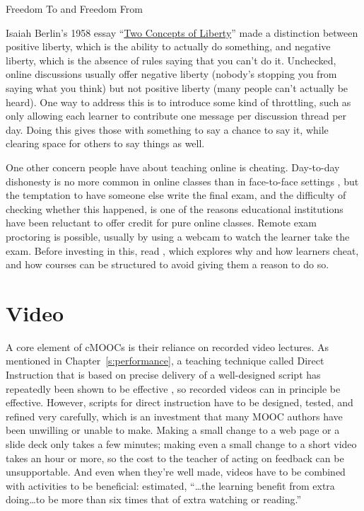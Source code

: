 \begin{aside}{Freedom To and Freedom From}

Isaiah Berlin's 1958 essay ``\href{https://en.wikipedia.org/wiki/Two\_Concepts\_of\_Liberty}{Two Concepts of
Liberty}'' made a distinction between positive
liberty, which is the ability to actually do something, and negative
liberty, which is the absence of rules saying that you can't do
it. Unchecked, online discussions usually offer negative liberty
(nobody's stopping you from saying what you think) but not positive
liberty (many people can't actually be heard). One way to address
this is to introduce some kind of throttling, such as only allowing
each learner to contribute one message per discussion thread per
day. Doing this gives those with something to say a chance to say
it, while clearing space for others to say things as well.

\end{aside}

One other concern people have about teaching online is cheating.
Day-to-day dishonesty is no more common in online classes than in
face-to-face settings \cite{Beck2014}, but the temptation to have
someone else write the final exam, and the difficulty of checking
whether this happened, is one of the reasons educational institutions
have been reluctant to offer credit for pure online classes. Remote exam
proctoring is possible, usually by using a webcam to watch the learner
take the exam. Before investing in this, read \cite{Lang2013}, which
explores why and how learners cheat, and how courses can be structured
to avoid giving them a reason to do so.

\section{Video}\label{s:online-video}

A core element of cMOOCs is their reliance on recorded video lectures.
As mentioned in Chapter~\ref{s:performance}, a teaching technique called
Direct Instruction that is based on precise delivery of a well-designed
script has repeatedly been shown to be effective \cite{Stoc2018}, so
recorded videos can in principle be effective. However, scripts for
direct instruction have to be designed, tested, and refined very
carefully, which is an investment that many MOOC authors have been
unwilling or unable to make. Making a small change to a web page or a
slide deck only takes a few minutes; making even a small change to a
short video takes an hour or more, so the cost to the teacher of acting
on feedback can be unsupportable. And even when they're well made,
videos have to be combined with activities to be beneficial:
\cite{Koed2015} estimated, ``{\ldots}the learning benefit from
extra doing{\ldots}to be more than six times that of extra
watching or reading.''

